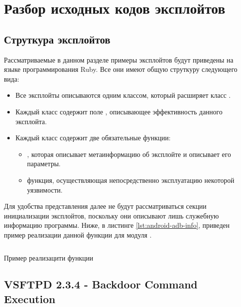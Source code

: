 \section{Разбор исходных кодов эксплойтов}

\subsection{Струткура эксплойтов}

Рассматриваемые в данном разделе примеры эксплойтов будут приведены на языке программирования Ruby. Все они имеют общую струткуру следующего вида:
\begin{itemize}
    \item Все эксплойты описываются одним классом, который расширяет класс .
    \item Каждый класс содержит поле , описывающее эффективность данного эксплойта.
    \item Каждый класс содержит две обязательные функции:
    \begin{itemize}
        \item {}, которая описывает метаинформацию об эксплойте и описывает его параметры.
        \item {} функция, осуществляющая непосредственно эксплуатацию некоторой уязвимости.
    \end{itemize} 
\end{itemize}
Для удобства представления далее не будут рассматриваться секции инициализации эксплойтов, поскольку 
они описывают лишь служебную информацию программы. Ниже, в листинге \ref{lst:android-adb-info}, приведен пример реализации данной функции для модуля 
.
\begin{listing}[H]
    \inputminted[firstline=15, lastline=42]{ruby}{resources/exploits/02_android_adb}
    \caption{Пример реализацити функции }
    \label{lst:android-adb-info}
\end{listing}

\subsection{VSFTPD 2.3.4 - Backdoor Command Execution}

